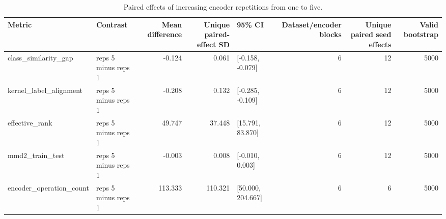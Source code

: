 \begin{table}[t]
\caption{Paired effects of increasing encoder repetitions from one to five.}
\label{tab:geometry-effects}
\begin{tabular}{llrrlrrr}
\toprule
Metric & Contrast & Mean difference & Unique paired-effect SD & 95\% CI & Dataset/encoder blocks & Unique paired seed effects & Valid bootstrap \\
\midrule
class\_similarity\_gap & reps 5 minus reps 1 & -0.124 & 0.061 & [-0.158, -0.079] & 6 & 12 & 5000 \\
kernel\_label\_alignment & reps 5 minus reps 1 & -0.208 & 0.132 & [-0.285, -0.109] & 6 & 12 & 5000 \\
effective\_rank & reps 5 minus reps 1 & 49.747 & 37.448 & [15.791, 83.870] & 6 & 12 & 5000 \\
mmd2\_train\_test & reps 5 minus reps 1 & -0.003 & 0.008 & [-0.010, 0.003] & 6 & 12 & 5000 \\
encoder\_operation\_count & reps 5 minus reps 1 & 113.333 & 110.321 & [50.000, 204.667] & 6 & 6 & 5000 \\
\bottomrule
\end{tabular}
\end{table}
